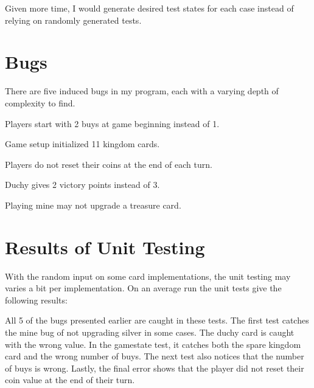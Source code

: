 \documentclass[letterpaper,10pt,onecolumn,draftclsnofoot]{IEEEtran}
\begin{document}


Given more time, I would generate desired test states for each case instead of relying on randomly generated tests.

\section{Bugs}
There are five induced bugs in my program, each with a varying depth of complexity to find.

Players start with 2 buys at game beginning instead of 1.


Game setup initialized 11 kingdom cards.


Players do not reset their coins at the end of each turn.


Duchy gives 2 victory points instead of 3.


Playing mine may not upgrade a treasure card.


\section{Results of Unit Testing}
With the random input on some card implementations, the unit testing may varies a bit per implementation. On an average run the unit tests give the following results:



All 5 of the bugs presented earlier are caught in these tests. The first test catches the mine bug of not upgrading silver in some cases. The duchy card is caught with the wrong value. In the gamestate test, it catches both the spare kingdom card and the wrong number of buys. The next test also notices that the number of buys is wrong. Lastly, the final error shows that the player did not reset their coin value at the end of their turn.
\end{document}
